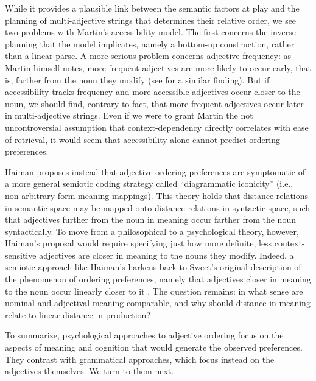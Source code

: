 \documentclass{pnastwo}
\begin{document}
\begin{article}
While it provides a plausible link between the semantic factors at play and the planning of multi-adjective strings that determines their relative order, we see two problems with Martin's accessibility model. The first concerns the inverse planning that the model implicates, namely a bottom-up construction, rather than a linear parse. A more serious problem concerns adjective frequency: as Martin himself notes, more frequent adjectives are more likely to occur early, that is, farther from the noun they modify (see  \cite{wulff2003} for a similar finding).  But if accessibility tracks frequency and more accessible adjectives occur closer to the noun, we should find, contrary to fact, that more frequent adjectives occur later in multi-adjective strings. Even if we were to grant Martin the not uncontroversial assumption that context-dependency directly correlates with ease of retrieval, it would seem that accessibility alone cannot predict ordering preferences.

Haiman \cite{haiman1985} proposes instead that adjective ordering preferences are symptomatic of a more general semiotic coding strategy called ``diagrammatic iconicity'' (i.e., non-arbitrary form-meaning mappings). This theory holds that distance relations in semantic space may be mapped onto distance relations in syntactic space, such that adjectives further from the noun in meaning occur farther from the noun syntactically. To move from a philosophical to a psychological theory, however, Haiman's proposal would require specifying just how more definite, less context-sensitive adjectives are closer in meaning to the nouns they modify. Indeed, a semiotic approach like Haiman's harkens back to Sweet's original description of the phenomenon of ordering preferences, namely that adjectives closer in meaning to the noun occur linearly closer to it \cite{sweet1898}. The question remains: in what sense are nominal and adjectival meaning comparable, and why should distance in meaning relate to linear distance in production?

To summarize, psychological approaches to adjective ordering focus on the aspects of meaning and cognition that would generate the observed preferences. They contrast with grammatical approaches, which focus instead on the adjectives themselves. We turn to them next.


\end{article}
\end{document}
